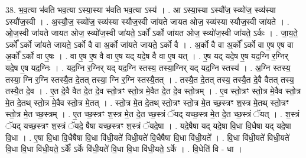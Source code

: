 \documentclass[17pt]{extarticle}
\begin{document}
38. भ॒व॒त्या भ॑वति भव॒त्या ऽस्या॒स्या भ॑वति भव॒त्या ऽस्य॑ । . आ ऽस्या॒स्या ऽस्यौ॑ज॒ स्व्यो॑ज॒ स्व्य॑स्या ऽस्यौ॑ज॒स्वी । . अ॒स्यौ॒ज॒ स्व्यो॑ज॒ स्व्य॑स्या स्यौज॒स्वी जा॑यते जायत ओज॒ स्व्य॑स्या स्यौज॒स्वी जा॑यते । . ओ॒ज॒स्वी जा॑यते जायत ओज॒ स्व्यो॑ज॒स्वी जा॑यते॒ ऽर्को᳚ ऽर्को जा॑यत ओज॒ स्व्यो॑ज॒स्वी जा॑यते॒ ऽर्कः । . जा॒य॒ते॒ ऽर्को᳚ ऽर्को जा॑यते जायते॒ ऽर्को वै वा अ॒र्को जा॑यते जायते॒ ऽर्को वै । . अ॒र्को वै वा अ॒र्को᳚ ऽर्को वा ए॒ष ए॒ष वा अ॒र्को᳚ ऽर्को वा ए॒षः । . वा ए॒ष ए॒ष वै वा ए॒ष यद् यदे॒ष वै वा ए॒ष यत् । . ए॒ष यद् यदे॒ष ए॒ष यद॒ग्नि र॒ग्निर् यदे॒ष ए॒ष यद॒ग्निः । . यद॒ग्नि र॒ग्निर् यद् यद॒ग्नि स्तस्य॒ तस्या॒ग्निर् यद् यद॒ग्नि स्तस्य॑ । . अ॒ग्नि स्तस्य॒ तस्या॒ ग्नि र॒ग्नि स्तस्यै॒त दे॒तत् तस्या॒ ग्नि र॒ग्नि स्तस्यै॒तत् । . तस्यै॒त दे॒तत् तस्य॒ तस्यै॒त दे॒वै वैतत् तस्य॒ तस्यै॒त दे॒व । . ए॒त दे॒वै वैत दे॒त दे॒व स्तो॒त्रꣳ स्तो॒त्र मे॒वैत दे॒त दे॒व स्तो॒त्रम् । . ए॒व स्तो॒त्रꣳ स्तो॒त्र मे॒वैव स्तो॒त्र मे॒त दे॒तथ् स्तो॒त्र मे॒वैव स्तो॒त्र मे॒तत् । . स्तो॒त्र मे॒त दे॒तथ् स्तो॒त्रꣳ स्तो॒त्र मे॒त च्छ॒स्त्रꣳ श॒स्त्र मे॒तथ् स्तो॒त्रꣳ स्तो॒त्र मे॒त च्छ॒स्त्रम् । . ए॒त च्छ॒स्त्रꣳ श॒स्त्र मे॒त दे॒त च्छ॒स्त्रं ॅयद् यच्छ॒स्त्र मे॒त दे॒त च्छ॒स्त्रं ॅयत् । . श॒स्त्रं ॅयद् यच्छ॒स्त्रꣳ श॒स्त्रं ॅयदे॒ षैषा यच्छ॒स्त्रꣳ श॒स्त्रं ॅयदे॒षा । . यदे॒षैषा यद् यदे॒षा वि॒धा वि॒धैषा यद् यदे॒षा वि॒धा । . ए॒षा वि॒धा वि॒धैषैषा वि॒धा वि॑धी॒यते॑ विधी॒यते॑ वि॒धैषैषा वि॒धा वि॑धी॒यते᳚ । . वि॒धा वि॑धी॒यते॑ विधी॒यते॑ वि॒धा वि॒धा वि॑धी॒यते॒ ऽर्के᳚ ऽर्के वि॑धी॒यते॑ वि॒धा वि॒धा वि॑धी॒यते॒ ऽर्के । . वि॒धेति॑ वि - धा । \newline
\pagebreak
{}
\end{document}
